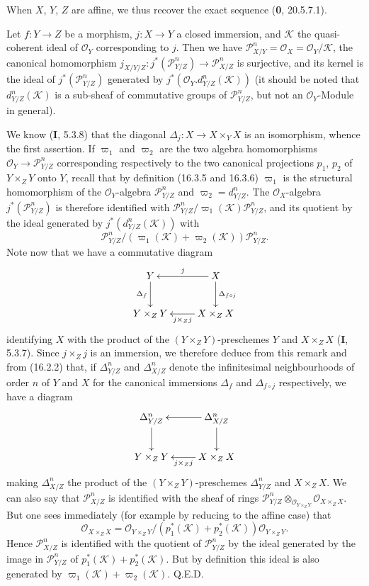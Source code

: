 When $X$, $Y$, $Z$ are affine, we thus recover the exact sequence
(\textbf{0}, 20.5.7.1).

\begin{proposition}[16.4.20]
\label{IV.16.4.20}
Let $f:Y\to Z$ be a morphism, $j:X\to Y$ a closed immersion, and
$\mathscr{K}$ the quasi-coherent ideal of $\mathcal{O}_Y$ corresponding to $j$.
Then we have
$\mathscr{P}_{X/Y}^n=\mathcal{O}_X=\mathcal{O}_Y/\mathscr{K}$,
the canonical homomorphism
$j_{X/Y/Z}:j^*(\mathscr{P}_{Y/Z}^n)\to\mathscr{P}_{X/Z}^n$ is surjective, and
its kernel is the ideal of $j^*(\mathscr{P}_{Y/Z}^n)$ generated by
$j^*(\mathcal{O}_Y.d_{Y/Z}^n(\mathscr{K}))$ (it should be noted that
$d_{Y/Z}^n(\mathscr{K})$ is a sub-sheaf of commutative groups of
$\mathscr{P}_{Y/Z}^n$, but not an $\mathcal{O}_Y$-Module in general).
\end{proposition}

We know (\textbf{I}, 5.3.8) that the diagonal
$\Delta_j:X\to X\times_Y X$ is an isomorphism, whence the first assertion.
If $\varpi_1$ and $\varpi_2$ are the two algebra homomorphisms
$\mathcal{O}_Y\to\mathscr{P}_{Y/Z}^n$ corresponding respectively to the two
canonical projections $p_1$, $p_2$ of $Y\times_Z Y$ onto $Y$, recall that
by definition (16.3.5 and 16.3.6) $\varpi_1$ is the structural homomorphism of
the $\mathcal{O}_Y$-algebra $\mathscr{P}_{Y/Z}^n$ and
$\varpi_2=d_{Y/Z}^n$. The $\mathcal{O}_X$-algebra
$j^*(\mathscr{P}_{Y/Z}^n)$ is therefore identified with
$\mathscr{P}_{Y/Z}^n/\varpi_1(\mathscr{K})\mathscr{P}_{Y/Z}^n$, and its quotient
by the ideal generated by $j^*(d_{Y/Z}^n(\mathscr{K}))$ with
\[
  \mathscr{P}_{Y/Z}^n/
  (\varpi_1(\mathscr{K})+\varpi_2(\mathscr{K}))\mathscr{P}_{Y/Z}^n.
\]
Note now that we have a commutative diagram
\[
  \xymatrix{
    Y\ar[d]_-{\Delta_f}&X\ar[l]_-j\ar[d]^-{\Delta_{f\circ j}}\\
    Y\times_Z Y&X\times_Z X\ar[l]^-{j\times_Z j}
  }
\]
identifying $X$ with the product of the $(Y\times_Z Y)$-preschemes $Y$ and
$X\times_Z X$ (\textbf{I}, 5.3.7). Since $j\times_Z j$ is an immersion, we therefore
deduce from this remark and from (16.2.2) that, if $\Delta_{Y/Z}^n$ and
$\Delta_{X/Z}^n$ denote the infinitesimal neighbourhoods of order $n$ of $Y$
and $X$ for the canonical immersions $\Delta_f$ and $\Delta_{f\circ j}$
respectively, we have a diagram
\[
  \xymatrix{
    \Delta_{Y/Z}^n\ar[d]&\Delta_{X/Z}^n\ar[l]\ar[d]\\
    Y\times_Z Y&X\times_Z X\ar[l]^-{j\times_Z j}
  }
\]
making $\Delta_{X/Z}^n$ the product of the $(Y\times_Z Y)$-preschemes
$\Delta_{Y/Z}^n$ and $X\times_Z X$. We can also say that
$\mathscr{P}_{X/Z}^n$ is identified with the sheaf of rings
$\mathscr{P}_{Y/Z}^n\otimes_{\mathcal{O}_{Y\times_Z Y}}
\mathcal{O}_{X\times_Z X}$. But one sees immediately (for example by reducing
to the affine case) that
\[
  \mathcal{O}_{X\times_Z X}=
  \mathcal{O}_{Y\times_Z Y}/
  (p_1^*(\mathscr{K})+p_2^*(\mathscr{K}))
  \mathcal{O}_{Y\times_Z Y}.
\]
Hence $\mathscr{P}_{X/Z}^n$ is identified with the quotient of
$\mathscr{P}_{Y/Z}^n$ by the ideal generated by the image in
$\mathscr{P}_{Y/Z}^n$ of $p_1^*(\mathscr{K})+p_2^*(\mathscr{K})$. But by
definition this ideal is also generated by
$\varpi_1(\mathscr{K})+\varpi_2(\mathscr{K})$. Q.E.D.

